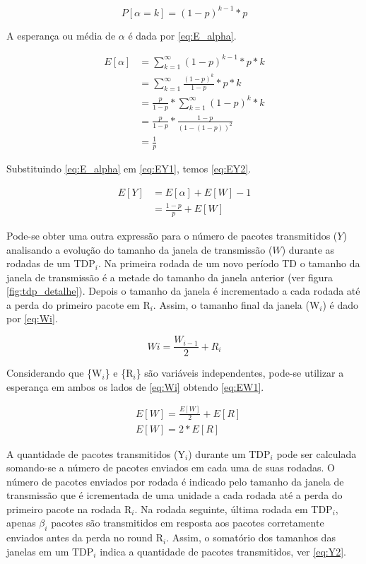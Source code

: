 \begin{equation} \label{eq:P_alpha}
P[\alpha=k]=(1 - p)^{k - 1} * p
\end{equation}

A esperança ou média de $\alpha$ é dada por \eqref{eq:E_alpha}.

\begin{align} \label{eq:E_alpha}
\nonumber E[\alpha] &= \sum_{k=1}^\infty (1 - p)^{k - 1} * p * k \\
\nonumber &= \sum_{k=1}^\infty \frac{(1 - p)^{k}}{1 - p} * p * k\\ 
\nonumber &= \frac{p}{1 - p} * \sum_{k=1}^\infty (1 - p)^k * k \\ 
\nonumber &= \frac{p}{1 - p} * \frac{1 - p}{(1 - (1 - p))^2} \\
&= \frac{1}{p}
\end{align}

Substituindo \eqref{eq:E_alpha} em \eqref{eq:EY1}, temos \eqref{eq:EY2}. 

\begin{align} \label{eq:EY2}
\nonumber E[Y] &= E[\alpha] + E[W] - 1 \\
&= \frac{1 - p}{p} + E[W]
\end{align}

Pode-se obter uma outra expressão para o número de pacotes transmitidos ($Y$) analisando
a evolução do tamanho da janela de transmissão ($W$) durante as rodadas de um TDP$_i$.
Na primeira rodada de um novo período TD o tamanho da janela de transmissão é a metade
do tamanho da janela anterior (ver figura \ref{fig:tdp_detalhe}). Depois o tamanho da janela
é incrementado a cada rodada até a perda do primeiro pacote em R{$_i$}. Assim, o tamanho 
final da janela (W$_i$) é dado por \eqref{eq:Wi}.

\begin{equation} \label{eq:Wi}
Wi=\frac{W_{i-1}}{2} + R_i
\end{equation}

Considerando que \{W$_i$\} e \{R$_i$\} são variáveis independentes, pode-se utilizar a 
esperança em ambos os lados de \eqref{eq:Wi} obtendo \eqref{eq:EW1}.

\begin{align} \label{eq:EW1}
\nonumber & E[W]=\frac{E[W]}{2} + E[R] \\
& E[W]= 2 * E[R]
\end{align}

A quantidade de pacotes transmitidos (Y$_i$) durante um TDP$_i$ pode ser calculada somando-se 
a número de pacotes enviados em cada uma de suas rodadas. O número de pacotes enviados por 
rodada é indicado pelo tamanho da janela de transmissão que é icrementada de uma unidade a 
cada rodada até a perda do primeiro pacote na rodada R$_i$. Na rodada seguinte, última rodada 
em TDP$_i$, apenas $\beta_i$ pacotes são transmitidos em resposta aos pacotes corretamente 
enviados antes da perda no round R$_i$. Assim, o somatório dos tamanhos das janelas em um 
TDP$_i$ indica a quantidade de pacotes transmitidos, ver \eqref{eq:Y2}.

